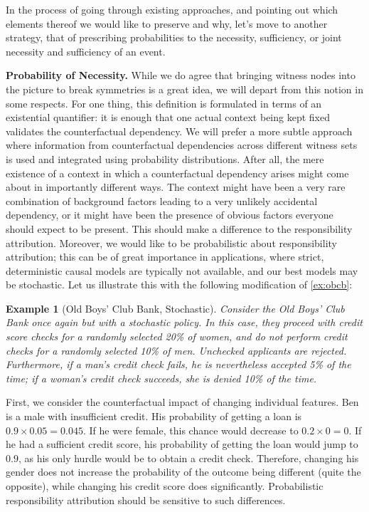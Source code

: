\documentclass[twoside,11pt]{article}
\newtheorem{example}{Example}
\begin{document}
\vspace{2mm}
In the process of going through existing approaches, and pointing out which elements thereof we would like to preserve and why, let's move to another strategy, that of prescribing probabilities to the necessity, sufficiency, or joint necessity and sufficiency of an event.


\vspace{2mm}
\noindent \textbf{Probability of Necessity.} While we do agree that bringing witness nodes into the picture to break symmetries is a great idea, we will depart from this notion in some respects. For one thing, this definition is formulated in terms of an existential quantifier: it is enough that one actual context being kept fixed validates the counterfactual dependency. We will prefer a more subtle approach where information from counterfactual dependencies across different witness sets is used and integrated using probability distributions. After all, the mere existence of a context in which a counterfactual dependency arises might come about in importantly different ways. The context might have been a very rare combination of background factors leading to a very unlikely accidental dependency, or it might have been the presence of obvious factors everyone should expect to be present. This should make a difference to the responsibility attribution.  Moreover, we would like to be probabilistic about responsibility attribution; this can be of great importance in applications, where strict, deterministic causal models are typically not available, and our best models may be stochastic. Let us illustrate this with the following modification of \cref{ex:obcb}: 
\begin{example}[Old Boys' Club Bank, Stochastic]
Consider the Old Boys' Club Bank once again but with a stochastic policy. In this case, they proceed with credit score checks for a randomly selected 20\% of women, and do not perform credit checks for a randomly selected 10\% of men. Unchecked applicants are rejected. Furthermore, if a man's credit check fails, he is nevertheless accepted 5\% of the time; if a woman's credit check succeeds, she is denied 10\% of the time. \label{ex:obcb_stochastic}
\end{example} 

First, we consider the counterfactual impact of changing individual features. Ben is a male with insufficient credit. His probability of getting a loan is $0.9 \times 0.05 = 0.045$. If he were female, this chance would decrease to $0.2 \times 0=0$.
If he had a sufficient credit score, his probability of getting the loan would jump to $0.9$, as his only hurdle would be to obtain a credit check. Therefore, changing his gender does not increase the probability of the outcome being different (quite the opposite), while changing his credit score does significantly. Probabilistic responsibility attribution should be sensitive to such differences.
\end{document}
